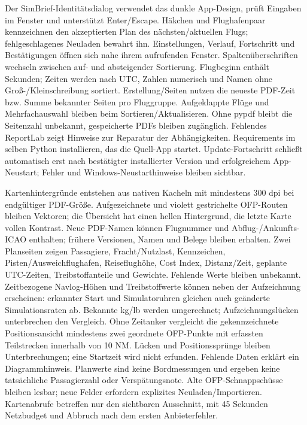\documentclass[11pt,a4paper]{article}
\begin{document}
Der SimBrief-Identitätsdialog verwendet das dunkle App-Design, prüft Eingaben
im Fenster und unterstützt Enter/Escape. Häkchen und Flughafenpaar kennzeichnen
den akzeptierten Plan des nächsten/aktuellen Flugs; fehlgeschlagenes Neuladen
bewahrt ihn. Einstellungen, Verlauf, Fortschritt und Bestätigungen öffnen sich
nahe ihrem aufrufenden Fenster. Spaltenüberschriften wechseln zwischen auf- und
absteigender Sortierung. Flugbeginn enthält Sekunden; Zeiten werden nach UTC,
Zahlen numerisch und Namen ohne Groß-/Kleinschreibung sortiert.
Erstellung/Seiten
nutzen die neueste PDF-Zeit bzw. Summe bekannter Seiten pro Fluggruppe.
Aufgeklappte Flüge und Mehrfachauswahl bleiben beim Sortieren/Aktualisieren.
Ohne pypdf bleibt die Seitenzahl unbekannt, gespeicherte PDFs bleiben
zugänglich.
Fehlendes ReportLab zeigt Hinweise zur Reparatur der Abhängigkeiten.
Requirements
im selben Python installieren, das die Quell-App startet. Update-Fortschritt
schließt automatisch erst nach bestätigter installierter Version und
erfolgreichem
App-Neustart; Fehler und Windows-Neustarthinweise bleiben sichtbar.

Kartenhintergründe entstehen aus nativen Kacheln mit mindestens 300 dpi
bei endgültiger PDF-Größe. Aufgezeichnete und violett gestrichelte OFP-Routen
bleiben Vektoren; die Übersicht hat einen hellen Hintergrund, die letzte Karte
vollen Kontrast. Neue PDF-Namen können Flugnummer und Abflug-/Ankunfts-ICAO
enthalten; frühere Versionen, Namen und Belege bleiben erhalten. Zwei Planseiten
zeigen Passagiere, Fracht/Nutzlast, Kennzeichen, Pisten/Ausweichflughafen,
Reiseflughöhe, Cost Index, Distanz/Zeit, geplante UTC-Zeiten, Treibstoffanteile
und Gewichte. Fehlende Werte bleiben unbekannt. Zeitbezogene Navlog-Höhen und
Treibstoffwerte können neben der Aufzeichnung erscheinen: erkannter Start und
Simulatoruhren gleichen auch geänderte Simulationsraten ab. Bekannte kg/lb
werden umgerechnet; Aufzeichnungslücken unterbrechen den Vergleich. Ohne
Zeitanker vergleicht die gekennzeichnete Positionsansicht mindestens zwei
geordnete OFP-Punkte mit erfassten Teilstrecken innerhalb von 10 NM. Lücken und
Positionssprünge bleiben Unterbrechungen; eine Startzeit wird nicht erfunden.
Fehlende Daten erklärt ein Diagrammhinweis. Planwerte sind keine
Bordmessungen und ergeben keine tatsächliche Passagierzahl oder Verspätungsnote.
Alte OFP-Schnappschüsse bleiben lesbar; neue Felder erfordern explizites
Neuladen/Importieren. Kartenabrufe betreffen nur den sichtbaren Ausschnitt,
mit 45 Sekunden Netzbudget und Abbruch nach dem ersten Anbieterfehler.
\end{document}
